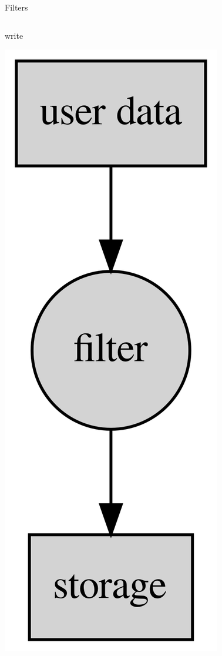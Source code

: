 \documentclass{beamer}
\begin{document}
\begin{frame}{Filters}
  \begin{columns}
    \begin{block}{write}
      \begin{center}
        \includegraphics[height=0.75\textheight]{images/write-filter.png}
      \end{center}
    \end{block}


\end{columns}
\end{frame}
\end{document}
